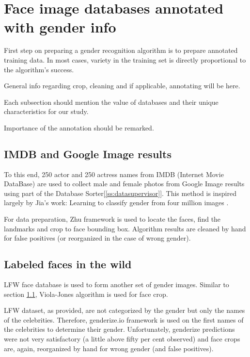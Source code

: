 \documentclass[runningheads]{llncs}
\begin{document}
\section{Face image databases annotated with gender info}
First step on preparing a gender recognition algorithm is to prepare annotated training data. In most cases, variety in the training set is directly proportional to the algorithm's success. 

General info regarding crop, cleaning and if applicable, annotating will be here.

Each subsection should mention the value of databases and their unique characteristics for our study.

Importance of the annotation\cite{mathias2014face} should be remarked.


\subsection{IMDB and Google Image results}\label{[ss-dbGenderGoogleImages]}

To this end, 250 actor and 250 actress names from IMDB (Internet Movie DataBase) are used to collect male and female photos from Google Image results using part of the Database Sorter\ref{[ss:datasupervisor]}. This method is inspired largely by Jia's work: Learning to classify gender from four million images
\cite{jia2015learning}.

For data preparation, Zhu framework\cite{zhu2012face} is used to locate the faces, find the landmarks and crop to face bounding box. Algorithm results are cleaned by hand for false positives (or reorganized in the case of wrong gender).

\subsection{Labeled faces in the wild}\label{ss-dbLFW}
LFW\cite{LFWTech} face database is used to form another set of gender images. Similar to section \ref{[ss-dbGenderGoogleImages]}, Viola-Jones algorithm is used for face crop.

LFW dataset, as provided, are not categorized by the gender but only the names of the celebrities. Therefore, genderize.io framework is used on the first names of the celebrities to determine their gender. Unfortunately, genderize predictions were not very satisfactory (a little above fifty per cent observed) and face crops are, again, reorganized by hand for wrong gender (and false positives).
\end{document}
